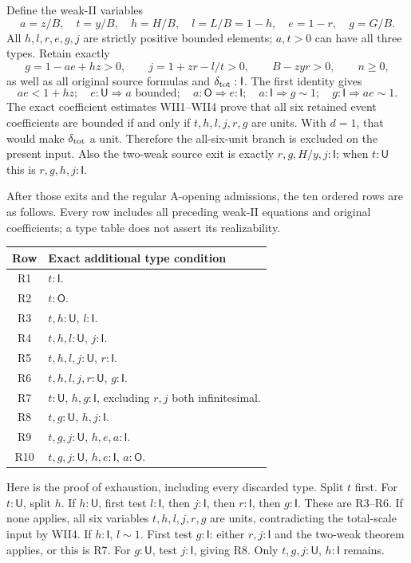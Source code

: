 \documentclass[11pt]{article}
\newcommand{\I}{\mathsf I}
\newcommand{\U}{\mathsf U}
\newcommand{\Otype}{\mathsf O}
\begin{document}
Define the weak-II variables
\[
a=z/B,\quad t=y/B,\quad h=H/B,\quad l=L/B=1-h,
\quad e=1-r,\quad g=G/B.
\]
All $h,l,r,e,g,j$ are strictly positive bounded elements; $a,t>0$ can
have all three types. Retain exactly
\[
g=1-ae+hz>0,\qquad j=1+zr-l/t>0,\qquad B-zyr>0,
\qquad n\ge0,
\]
as well as all original source formulas and $\delta_{\rm tot}:\I$.
The first identity gives
\[
ae<1+hz;\quad e:\U\Rightarrow a\text{ bounded};\quad
a:\Otype\Rightarrow e:\I;\quad a:\I\Rightarrow g\sim1;
\quad g:\I\Rightarrow ae\sim1. \tag{WF}
\]
The exact coefficient estimates WII1--WII4 prove that all six retained
event coefficients are bounded if and only if
$t,h,l,j,r,g$ are units. With $d=1$, that would make
$\delta_{\rm tot}$ a unit. Therefore the all-six-unit branch is
excluded on the present input. Also the two-weak source exit is exactly
$r,g,H/y,j:\I$; when $t:\U$ this is $r,g,h,j:\I$.

After those exits and the regular A-opening admissions, the ten ordered
rows are as follows. Every row includes all preceding weak-II equations
and original coefficients; a type table does not assert its realizability.
\begin{longtable}{c p{.78\linewidth}}
\toprule Row & Exact additional type condition \\\midrule
R1 & $t:\I$.\\
R2 & $t:\Otype$.\\
R3 & $t,h:\U$, $l:\I$.\\
R4 & $t,h,l:\U$, $j:\I$.\\
R5 & $t,h,l,j:\U$, $r:\I$.\\
R6 & $t,h,l,j,r:\U$, $g:\I$.\\
R7 & $t:\U$, $h,g:\I$, excluding $r,j$ both infinitesimal.\\
R8 & $t,g:\U$, $h,j:\I$.\\
R9 & $t,g,j:\U$, $h,e,a:\I$.\\
R10 & $t,g,j:\U$, $h,e:\I$, $a:\Otype$.\\
\bottomrule
\end{longtable}

Here is the proof of exhaustion, including every discarded type.
Split $t$ first. For $t:\U$, split $h$. If $h:\U$, first test
$l:\I$, then $j:\I$, then $r:\I$, then $g:\I$. These are R3--R6.
If none applies, all six variables $t,h,l,j,r,g$ are units, contradicting
the total-scale input by WII4. If $h:\I$, $l\sim1$. First test
$g:\I$: either $r,j:\I$ and the two-weak theorem applies, or this is
R7. For $g:\U$, test $j:\I$, giving R8. Only
$t,g,j:\U$, $h:\I$ remains.
\end{document}
